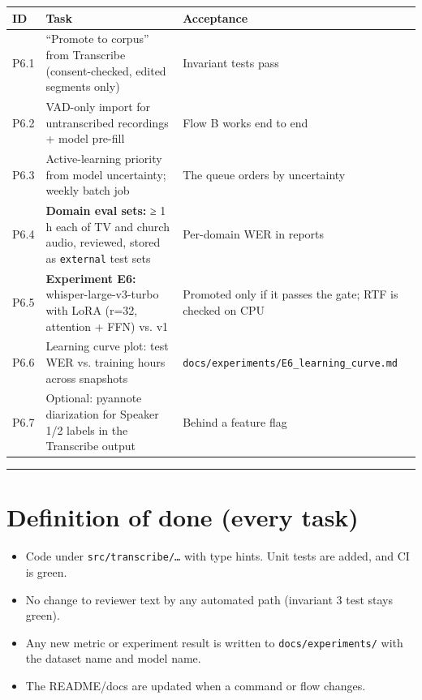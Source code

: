 \documentclass[11pt]{article}
\begin{document}
\begin{longtable}[]{@{}>{\raggedright\arraybackslash}p{}>{\raggedright\arraybackslash}p{}>{\raggedright\arraybackslash}p{}@{}}
\toprule\noalign{}
ID & Task & Acceptance \\
\midrule\noalign{}
\endhead
\bottomrule\noalign{}
\endlastfoot
P6.1 & ``Promote to corpus'' from Transcribe (consent-checked, edited segments only) & Invariant tests pass \\
P6.2 & VAD-only import for untranscribed recordings + model pre-fill & Flow B works end to end \\
P6.3 & Active-learning priority from model uncertainty; weekly batch job & The queue orders by uncertainty \\
P6.4 & \textbf{Domain eval sets:} ≥ 1 h each of TV and church audio, reviewed, stored as \texttt{external} test sets & Per-domain WER in reports \\
P6.5 & \textbf{Experiment E6:} whisper-large-v3-turbo with LoRA (r=32, attention + FFN) vs. v1 & Promoted only if it passes the gate; RTF is checked on CPU \\
P6.6 & Learning curve plot: test WER vs. training hours across snapshots & \texttt{docs/\allowbreak{}experiments/\allowbreak{}E6\_\allowbreak{}learning\_\allowbreak{}curve.\allowbreak{}md} \\
P6.7 & Optional: pyannote diarization for Speaker 1/2 labels in the Transcribe output & Behind a feature flag \\
\end{longtable}

\begin{center}\rule{0.5\linewidth}{0.5pt}\end{center}

\hypertarget{definition-of-done-every-task}{%
\section{Definition of done (every task)}\label{definition-of-done-every-task}}

\begin{itemize}
\tightlist
\item
  Code under \texttt{src/\allowbreak{}transcribe/\allowbreak{}…} with type hints. Unit tests are added, and CI is green.
\item
  No change to reviewer text by any automated path (invariant 3 test stays green).
\item
  Any new metric or experiment result is written to \texttt{docs/\allowbreak{}experiments/\allowbreak{}} with the dataset name and model name.
\item
  The README/docs are updated when a command or flow changes.
\end{itemize}
\end{document}

